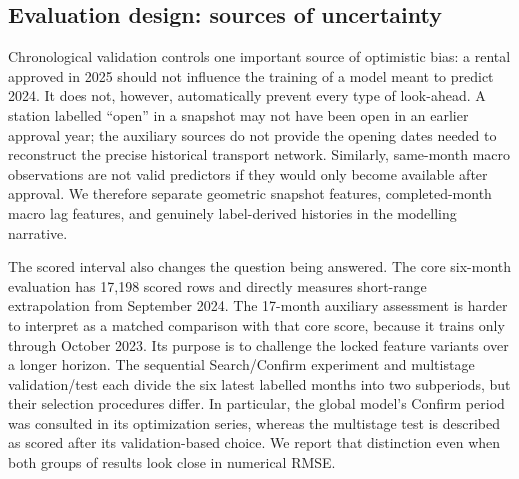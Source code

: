 \documentclass[10pt,a4paper]{article}
\begin{document}
\subsection{Evaluation design: sources of uncertainty}
Chronological validation controls one important source of optimistic bias: a rental approved in 2025 should not influence the training of a model meant to predict 2024. It does not, however, automatically prevent every type of look-ahead. A station labelled ``open'' in a snapshot may not have been open in an earlier approval year; the auxiliary sources do not provide the opening dates needed to reconstruct the precise historical transport network. Similarly, same-month macro observations are not valid predictors if they would only become available after approval. We therefore separate geometric snapshot features, completed-month macro lag features, and genuinely label-derived histories in the modelling narrative.

The scored interval also changes the question being answered. The core six-month evaluation has 17,198 scored rows and directly measures short-range extrapolation from September 2024. The 17-month auxiliary assessment is harder to interpret as a matched comparison with that core score, because it trains only through October 2023. Its purpose is to challenge the locked feature variants over a longer horizon. The sequential Search/Confirm experiment and multistage validation/test each divide the six latest labelled months into two subperiods, but their selection procedures differ. In particular, the global model's Confirm period was consulted in its optimization series, whereas the multistage test is described as scored after its validation-based choice. We report that distinction even when both groups of results look close in numerical RMSE.
\end{document}
